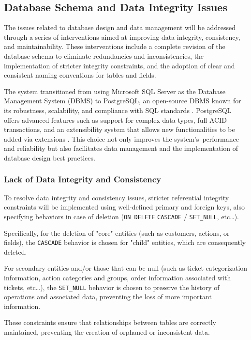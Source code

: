 \subsection{Database Schema and Data Integrity Issues}
The issues related to database design and data management will be addressed through a series of interventions aimed at improving data integrity, consistency, and maintainability. These interventions include a complete revision of the database schema to eliminate redundancies and inconsistencies, the implementation of stricter integrity constraints, and the adoption of clear and consistent naming conventions for tables and fields.

The system transitioned from using Microsoft SQL Server as the Database Management System (DBMS) to PostgreSQL, an open-source DBMS known for its robustness, scalability, and compliance with SQL standards \cite{postgres_implementation}. PostgreSQL offers advanced features such as support for complex data types, full ACID transactions, and an extensibility system that allows new functionalities to be added via extensions \cite{postgres_implementation}. This choice not only improves the system's~performance and reliability but also facilitates data management and the implementation of database design best practices.

\subsubsection{Lack of Data Integrity and Consistency}
To resolve data integrity and consistency issues, stricter referential integrity constraints will be implemented using well-defined primary and foreign keys, also specifying behaviors in case of deletion (\texttt{ON DELETE} \texttt{CASCADE} / \texttt{SET\_NULL}, etc\dots).

Specifically, for the deletion of "core" entities (such as customers, actions, or fields), the \texttt{CASCADE} behavior is chosen for "child" entities, which are consequently deleted.

For secondary entities and/or those that can be null (such as ticket categorization information, action categories and groups, order information associated with tickets, etc\dots), the \texttt{SET\_NULL} behavior is chosen to preserve the history of operations and associated data, preventing the loss of more important information.

These constraints ensure that relationships between tables are correctly maintained, preventing the creation of orphaned or inconsistent data.

